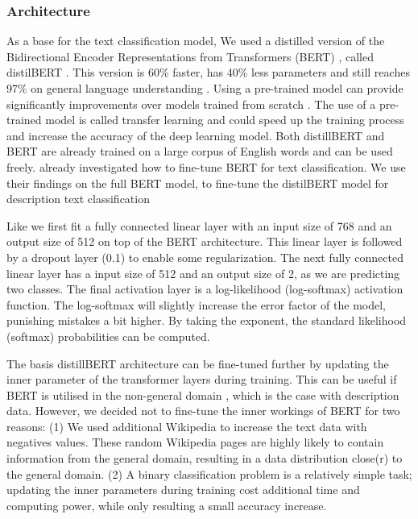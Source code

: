 \documentclass[a4paper, 12pt, oneside]{book} %
\begin{document}
\subsubsection{Architecture} \label{par:Architecture}
As a base for the text classification model, We used a distilled version of the Bidirectional Encoder Representations from Transformers (BERT) \autocite{devlin_bert_2019}, called distilBERT \autocite{sanh_distilbert_2020}. 
This version is 60\% faster, has 40\% less parameters and still reaches 97\% on general language understanding \autocite{sanh_distilbert_2020}.
Using a pre-trained model can provide significantly improvements over models trained from scratch \autocite{mikolov_distributed_2013}.
The use of a pre-trained model is called transfer learning and could speed up the training process and increase the accuracy of the deep learning model.
Both distillBERT and BERT are already trained on a large corpus of English words and can be used freely.
\textcite{sun_how_2020} already investigated how to fine-tune BERT for text classification.
We use their findings on the full BERT model, to fine-tune the distilBERT model for description text classification

Like \textcite{sun_how_2020} we first fit a fully connected linear layer with an input size of 768 and an output size of 512 on top of the BERT architecture. 
This linear layer is followed by a dropout layer (0.1) to enable some regularization.
The next fully connected linear layer has a input size of 512 and an output size of 2, as we are predicting two classes.
The final activation layer is a log-likelihood (log-softmax) activation function.
The log-softmax will slightly increase the error factor of the model, punishing mistakes a bit higher.
By taking the exponent, the standard likelihood (softmax) probabilities can be computed.

The basis distillBERT architecture can be fine-tuned further by updating the inner parameter of the transformer layers during training. 
This can be useful if BERT is utilised in the non-general domain \autocite{devlin_bert_2019, sun_how_2020, sanh_distilbert_2020}, which is the case with description data.
However, we decided not to fine-tune the inner workings of BERT for two reasons: 
(1) We used additional Wikipedia to increase the text data with negatives values.
These random Wikipedia pages are highly likely to contain information from the general
domain, resulting in a  data distribution close(r) to the general domain.
(2) A binary classification problem is a relatively simple task; updating the inner parameters during training cost additional time and computing power, while only resulting a small accuracy increase.
\end{document}
